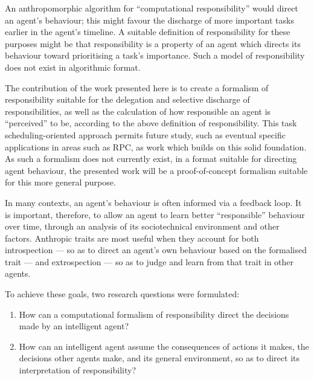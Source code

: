 An anthropomorphic algorithm for ``computational responsibility'' would direct an agent's behaviour; this might favour the discharge of more important tasks earlier in the agent's timeline. A suitable definition of responsibility for these purposes might be that responsibility is a property of an agent which directs its behaviour toward prioritising a task's importance. Such a model of responsibility does not exist in algorithmic format.\par


The contribution of the work presented here is to create a formalism of responsibility suitable for the delegation and selective discharge of responsibilities, as well as the calculation of how responsible an agent is ``perceived'' to be, according to the above definition of responsibility. This task scheduling-oriented approach permits future study, such as eventual specific applications in areas such as RPC, as work which builds on this solid foundation. As such a formalism does not currently exist, in a format suitable for directing agent behaviour, the presented work will be a proof-of-concept formalism suitable for this more general purpose.\par

In many contexts, an agent's behaviour is often informed via a feedback loop. It is important, therefore, to allow an agent to learn better ``responsible'' behaviour over time, through an analysis of its sociotechnical environment and other factors. Anthropic traits are most useful when they account for both introspection --- so as to direct an agent's own behaviour based on the formalised trait --- and extrospection --- so as to judge and learn from that trait in other agents.\par

To achieve these goals, two research questions were formulated:

\begin{enumerate}\label{RQ}
    \item How can a computational formalism of responsibility direct the decisions made by an intelligent agent?
    \item How can an intelligent agent assume the consequences of actions it makes, the decisions other agents make, and its general environment, so as to direct its interpretation of responsibility?
\end{enumerate}\par

